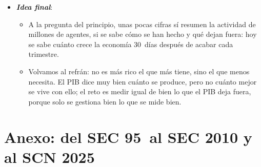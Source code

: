 \documentclass[11pt]{article}
\begin{document}
\begin{itemize}
\begin{itemize}
  \item Lo que sí hay que mejorar es la medición de lo nuevo. En 1987,  escribió que «la era de los ordenadores se ve en todas partes, salvo en las estadísticas de productividad»;\footnote{En el original: «You can see the computer age everywhere but in the productivity statistics», en una reseña de libros del \emph{New York Times}\nocite{Solow1987Watch}.} hoy la pregunta se repite con los servicios digitales gratuitos, los datos y la inteligencia artificial.
  \item Lo razonable es completarlo con la renta disponible de los hogares, los balances y las cuentas ambientales y distributivas, que es lo que hace el SCN 2025.
  \end{itemize}
\item \textbf{\emph{Idea final}}:
  \begin{itemize}
  \item A la pregunta del principio, unas pocas cifras sí resumen la actividad de millones de agentes, si se sabe cómo se han hecho y qué dejan fuera: hoy se sabe cuánto crece la economía 30~días después de acabar cada trimestre.
  \item Volvamos al refrán: no es más rico el que más tiene, sino el que menos necesita. El PIB dice muy bien cuánto se produce, pero no cuánto mejor se vive con ello; el reto es medir igual de bien lo que el PIB deja fuera, porque solo se gestiona bien lo que se mide bien.
  \end{itemize}
\end{itemize}

\clearpage
\appendix

\section{Anexo: del SEC 95~al SEC 2010 y al SCN 2025}\label{anexo:sec95}
\end{document}
